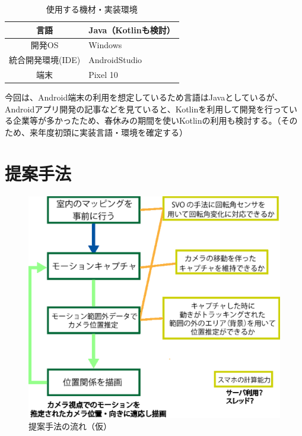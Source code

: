 \documentclass[11pt]{jreport}
\begin{document}
\begin{center}
\begin{table}[H]
\caption{使用する機材・実装環境}
\label{jikkoukannkyou}
\center
\begin{tabular}{|c||l|} \hline
言語 & Java（Kotlinも検討） \\ \hline 
開発OS & Windows  \\ \hline
統合開発環境(IDE) & AndroidStudio \\ \hline
端末 & Pixel 10 \\ \hline
\end{tabular}
\end{table}
\end{center}

今回は、Android端末の利用を想定しているため言語はJavaとしているが、Androidアプリ開発の記事などを見ていると、Kotlinを利用して開発を行っている企業等が多かったため、春休みの期間を使いKotlinの利用も検討する。（そのため、来年度初頭に実装言語・環境を確定する）

\chapter{提案手法}\label{chap:fig-tab-exp}

\begin{figure}[htbp]
  \centering
  \includegraphics[scale = 0.5]{memo1.eps}
  \caption{提案手法の流れ（仮）}
  \label{shuhoufig1}
\end{figure}
\end{document}
